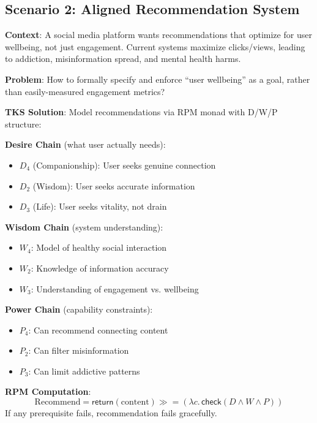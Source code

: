 \documentclass[11pt,twoside]{article}
\theoremstyle{definition}
\theoremstyle{plain}
\theoremstyle{remark}
\newcommand{\rpmret}{\mathsf{return}}
\newcommand{\rpmbind}{\mathbin{\gg\!=}}
\begin{document}
\subsection{Scenario 2: Aligned Recommendation System}

\begin{tcolorbox}[colback=yellow!10!white,colframe=orange!75!black,title=\textbf{Scenario: Social Media Recommendations}]
\textbf{Context}: A social media platform wants recommendations that optimize for
user wellbeing, not just engagement. Current systems maximize clicks/views, leading
to addiction, misinformation spread, and mental health harms.

\textbf{Problem}: How to formally specify and enforce ``user wellbeing'' as a goal,
rather than easily-measured engagement metrics?

\textbf{TKS Solution}: Model recommendations via RPM monad with D/W/P structure:

\textbf{Desire Chain} (what user actually needs):
\begin{itemize}
  \item $D_4$ (Companionship): User seeks genuine connection
  \item $D_2$ (Wisdom): User seeks accurate information
  \item $D_3$ (Life): User seeks vitality, not drain
\end{itemize}

\textbf{Wisdom Chain} (system understanding):
\begin{itemize}
  \item $W_4$: Model of healthy social interaction
  \item $W_2$: Knowledge of information accuracy
  \item $W_3$: Understanding of engagement vs. wellbeing
\end{itemize}

\textbf{Power Chain} (capability constraints):
\begin{itemize}
  \item $P_4$: Can recommend connecting content
  \item $P_2$: Can filter misinformation
  \item $P_3$: Can limit addictive patterns
\end{itemize}

\textbf{RPM Computation}:
\[
\text{Recommend} = \rpmret(\text{content}) \rpmbind (\lambda c.\, \mathsf{check}(D \wedge W \wedge P))
\]
If any prerequisite fails, recommendation fails gracefully.
\end{tcolorbox}
\end{document}
